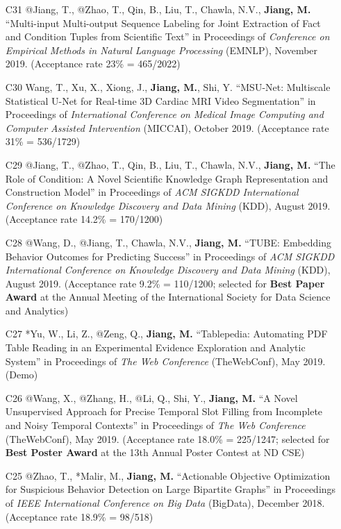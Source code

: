 \documentclass[10pt]{article}
\newenvironment{myindentpar}[1]%
{\begin{list}{}%
         {\setlength{\leftmargin}{#1}}%
         \item[]%
}
{\end{list}}
\newcounter{list}
\begin{document}
\begin{myindentpar}{0.00cm}
\begin{enumerate}[leftmargin=.5cm]
\item[C31] @Jiang, T., @Zhao, T., Qin, B., Liu, T., Chawla, N.V., \textbf{Jiang, M.} ``Multi-input Multi-output Sequence Labeling for Joint Extraction of Fact and Condition Tuples from Scientific Text'' in Proceedings of \textit{Conference on Empirical Methods in Natural Language Processing} (EMNLP), November 2019. (Acceptance rate 23\% = 465/2022)

\item[C30] Wang, T., Xu, X., Xiong, J., \textbf{Jiang, M.}, Shi, Y. ``MSU-Net: Multiscale Statistical U-Net for Real-time 3D Cardiac MRI Video Segmentation'' in Proceedings of \textit{International Conference on Medical Image Computing and Computer Assisted Intervention} (MICCAI), October 2019. (Acceptance rate 31\% = 536/1729)

\item[C29] @Jiang, T., @Zhao, T., Qin, B., Liu, T., Chawla, N.V., \textbf{Jiang, M.} ``The Role of Condition: A Novel Scientific Knowledge Graph Representation and Construction Model'' in Proceedings of \textit{ACM SIGKDD International Conference on Knowledge Discovery and Data Mining} (KDD), August 2019. (Acceptance rate 14.2\% = 170/1200)

\item[C28] @Wang, D., @Jiang, T., Chawla, N.V., \textbf{Jiang, M.} ``TUBE: Embedding Behavior Outcomes for Predicting Success'' in Proceedings of \textit{ACM SIGKDD International Conference on Knowledge Discovery and Data Mining} (KDD), August 2019. (Acceptance rate 9.2\% = 110/1200; selected for \textbf{Best Paper Award} at the Annual Meeting of the International Society for Data Science and Analytics)
	
\item[C27] *Yu, W., Li, Z., @Zeng, Q., \textbf{Jiang, M.} ``Tablepedia: Automating PDF Table Reading in an Experimental Evidence Exploration and Analytic System'' in Proceedings of \textit{The Web Conference} (TheWebConf), May 2019. (Demo)
	
\item[C26] @Wang, X., @Zhang, H., @Li, Q., Shi, Y., \textbf{Jiang, M.} ``A Novel Unsupervised Approach for Precise Temporal Slot Filling from Incomplete and Noisy Temporal Contexts'' in Proceedings of \textit{The Web Conference} (TheWebConf), May 2019. (Acceptance rate 18.0\% = 225/1247; selected for \textbf{Best Poster Award} at the 13th Annual Poster Contest at ND CSE)

\item[C25] @Zhao, T., *Malir, M., \textbf{Jiang, M.} ``Actionable Objective Optimization for Suspicious Behavior Detection on Large Bipartite Graphs'' in Proceedings of \textit{IEEE International Conference on Big Data} (BigData), December 2018. (Acceptance rate 18.9\% = 98/518)


\end{enumerate}
\end{myindentpar}
\end{document}
